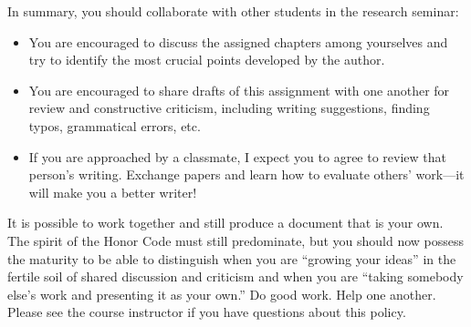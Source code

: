 In summary, you should collaborate with other students in the research seminar:

\begin{itemize}

\item You are {encouraged} to discuss the assigned chapters among yourselves and try to identify the
  most crucial points developed by the author.

\item You are  encouraged to share drafts of this assignment with one another for review and constructive criticism,
  including writing suggestions, finding typos, grammatical errors, etc.

\item If you are approached by a classmate, I expect you to agree to review that person's writing.  Exchange
  papers and learn how to evaluate others' work---it will make you a better writer!

\end{itemize}

It is possible to work together and still produce a document that is your own. The spirit of the Honor Code must still
predominate, but you should now possess the maturity to be able to distinguish when you are ``growing your ideas'' in
the fertile soil of shared discussion and criticism and when you are ``taking somebody else's work and presenting it as
your own.'' Do good work. Help one another. Please see the course instructor if you have questions about this policy.


